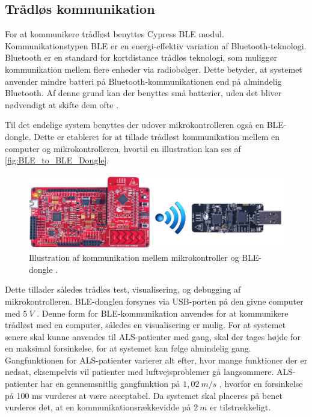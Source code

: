 \subsection{Trådløs kommunikation}\label{sec:traadloes_komm_design}
For at kommunikere trådløst benyttes Cypress BLE modul. Kommunikationstypen BLE \citep{cypressguide2014} er en energi-effektiv variation af Bluetooth-teknologi. Bluetooth er en standard for kortdistance trådløs teknologi, som muliggør kommunikation mellem flere enheder via radiobølger. Dette betyder, at systemet anvender mindre batteri på Bluetooth-kommunikationen end på almindelig Bluetooth. Af denne grund kan der benyttes små batterier, uden det bliver nødvendigt at skifte dem ofte \citep{gupta2013}. 

\noindent
Til det endelige system benyttes der udover mikrokontrolleren også en BLE-dongle. Dette er etableret for at tillade trådløst kommunikation mellem en computer og mikrokontrolleren, hvortil en illustration kan ses af \autoref{fig:BLE_to_BLE_Dongle}. 

\begin{figure}[H]
	\centering
	\includegraphics[width=1\textwidth]{figures/BLEToBLEdongle}
	\caption{Illustration af kommunikation mellem mikrokontroller og BLE-dongle \citep{cypresspsoc2015, cypressguide2014}.}
	\label{fig:BLE_to_BLE_Dongle}
\end{figure}


Dette tillader således trådløs test, visualisering, og debugging af mikrokontrolleren. BLE-donglen forsynes via USB-porten på den givne computer med $5~V$ \citep{cypressguide2014}. Denne form for BLE-kommunikation anvendes for at kommunikere trådløst med en computer, således en visualisering er mulig. For at systemet senere skal kunne anvendes til ALS-patienter med gang, skal der tages højde for en maksimal forsinkelse, for at systemet kan følge almindelig gang. Gangfunktionen for ALS-patienter varierer alt efter, hvor mange funktioner der er nedsat, eksempelvis vil patienter med luftvejsproblemer gå langsommere. ALS-patienter har en gennemsnitlig gangfunktion på $1,02~m/s$ \citep{hausdorff2000}, hvorfor en forsinkelse på 100 ms vurderes at være acceptabel. Da systemet skal placeres på benet vurderes det, at en kommunikationsrækkevidde på $2~m$ er tilstrækkeligt.
\\

